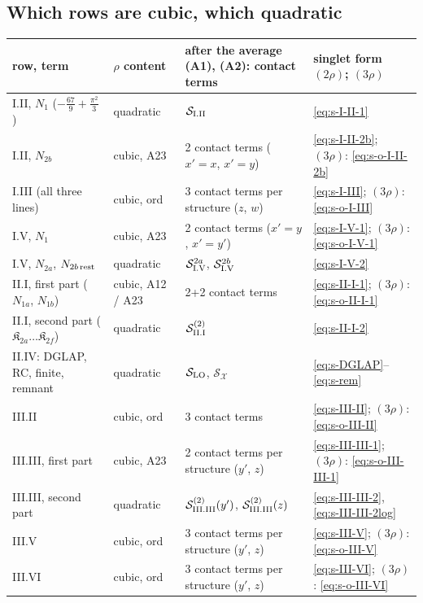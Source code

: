 {\subsection{Which rows are cubic, which quadratic}
\begin{center}
\renewcommand{\arraystretch}{1.3}
\small\begin{tabular}{|l|l|l|l|}
\hline
row, term & $\rho$ content & after the average (A1), (A2): contact terms & singlet form $(2\rho)$; $(3\rho)$ \\ \hline
I.II, $N_{1}$ ($-\frac{67}{9}+\frac{\pi^{2}}{3}$) & quadratic & $\mathcal{S}_{\rm I.II}$ & \eqref{eq:s-I-II-1} \\
I.II, $N_{2b}$ & cubic, A23 & 2 contact terms ($x'{=}x$, $x'{=}y$) & \eqref{eq:s-I-II-2b}; $(3\rho)$: \eqref{eq:s-o-I-II-2b} \\
I.III (all three lines) & cubic, ord & 3 contact terms per structure ($z$, $w$) & \eqref{eq:s-I-III}; $(3\rho)$: \eqref{eq:s-o-I-III} \\
I.V, $N_{1}$ & cubic, A23 & 2 contact terms ($x'{=}y$, $x'{=}y'$) & \eqref{eq:s-I-V-1}; $(3\rho)$: \eqref{eq:s-o-I-V-1} \\
I.V, $N_{2a}$, $N_{2b\,\rm rest}$ & quadratic & $\mathcal{S}^{2a}_{\rm I.V}$, $\mathcal{S}^{2b}_{\rm I.V}$ & \eqref{eq:s-I-V-2} \\
II.I, first part ($N_{1a}$, $N_{1b}$) & cubic, A12 / A23 & 2+2 contact terms & \eqref{eq:s-II-I-1}; $(3\rho)$: \eqref{eq:s-o-II-I-1} \\
II.I, second part ($\mathfrak{K}_{2a}\dots\mathfrak{K}_{2f}$) & quadratic & $\mathcal{S}^{(2)}_{\rm II.I}$ & \eqref{eq:s-II-I-2} \\
II.IV: DGLAP, RC, finite, remnant & quadratic & $\mathcal{S}_{\rm LO}$, $\mathcal{S}_{\mathcal{X}}$ & \eqref{eq:s-DGLAP}--\eqref{eq:s-rem} \\
III.II & cubic, ord & 3 contact terms & \eqref{eq:s-III-II}; $(3\rho)$: \eqref{eq:s-o-III-II} \\
III.III, first part & cubic, A23 & 2 contact terms per structure ($y'$, $z$) & \eqref{eq:s-III-III-1}; $(3\rho)$: \eqref{eq:s-o-III-III-1} \\
III.III, second part & quadratic & $\mathcal{S}^{(2)}_{\rm III.III}(y')$, $\mathcal{S}^{(2)}_{\rm III.III}(z)$ & \eqref{eq:s-III-III-2}, \eqref{eq:s-III-III-2log} \\
III.V & cubic, ord & 3 contact terms per structure ($y'$, $z$) & \eqref{eq:s-III-V}; $(3\rho)$: \eqref{eq:s-o-III-V} \\
III.VI & cubic, ord & 3 contact terms per structure ($y'$, $z$) & \eqref{eq:s-III-VI}; $(3\rho)$: \eqref{eq:s-o-III-VI} \\ \hline

\end{tabular}
\end{center}}
